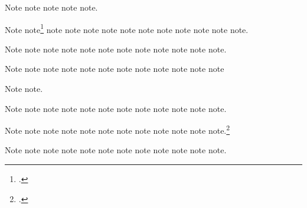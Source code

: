\documentclass[a4paper,12pt]{report}
\begin{document}
Note\autocite{eliot:pound} note\autocite{euripides:orestes}
note\autocite{ellet:galena} note\autocite{episode:tv}
note\autocite{emerson:nature}.


Note\autocite{evanston:library}
note\footnote{.}
note\autocite{euripides:orestes} note\autocite{friedman:learning}
note\autocite{evanston:library} note\autocite{feydeau:farces}
note\autocite{friedman:learning} note\autocite{furet:passing:eng}
note\autocite{garaud:gatine} note\autocite{garrett}
note\autocite{gibbard} note\autocite{furet:passing:eng}
note\autocite{garrett}.

Note\autocite{gourmet:052006} note\autocite{garaud:gatine}
note\autocite{greek:filmstrip} note\autocite{grove:sibelius}
note\autocite{handel:messiah} note\autocite{harley:cartography}
note\autocite{gibbard} note\autocite{hitchcock:nbynw}
note\autocite{hlatky:hrt} note\autocite{greek:filmstrip}
note\autocite{gourmet:052006} note\autocite{handel:messiah}.

Note\autocite[Sibelius, Jean]{grove:sibelius}
note\autocite{hitchcock:nbynw} note\autocite{horsley:prosodies}
note\autocite{harley:cartography}
note\autocite{jackson:paulina:letter} note\autocite{hlatky:hrt}
note\autocite{james:ambassadors} note\autocite{horsley:prosodies}
note\autocite{keating:dearborn} note\autocite{jackson:paulina:letter}
note\autocite{kern} note\autocite{james:ambassadors}

Note\autocite{kimluu:diethyl} note\autocite{keating:dearborn}.


Note\autocite{kozinn:review} note\autocite{kern}
note\autocite{lach:asia} note\autocite{kimluu:diethyl}
note\autocite{lakeforester:pushcarts} note\autocite{kozinn:review}
note\autocite{levistrauss:savage} note\autocite{lach:asia}
note\autocite{leo:madonna} note\autocite{lewis}
note\autocite{lakeforester:pushcarts}
note\autocite{levistrauss:savage}.

Note\autocite{lecarre:quest} note\autocite[29]{lewis}
note\autocite{lecarre:quest} note\autocite{lippincott:chicago}
note\autocite{loften:hamlet} note\autocite{maisonneuve:relations}
note\autocite{lippincott:chicago} note\autocite{loften:hamlet}
note\autocite{mchugh:wake} note\autocite{mcmillen:antebellum}
note\autocite{maisonneuve:relations}
note.\footnote{.}

Note\autocite{mchugh:wake} note\autocite[6.9.4]{mla:style}
note\autocite{morgenson:market} note\autocite{mozart:figaro}
note\autocite{murphy:silent} note\autocite{nass:address}
note\autocite{mcmillen:antebellum} note\autocite{natrecoff:camera}
note\autocite[2:25]{meredith:letters} note\autocite[6.9.5]{mla:style}
note\autocite{morgenson:market} note\autocite{mozart:figaro}.
\end{document}
